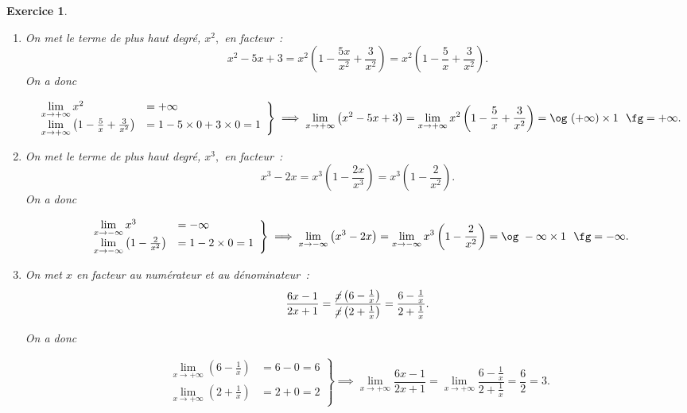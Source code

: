 \documentclass[10pt]{article}
\newtheorem{exo}{Exercice}
\begin{document}
\begin{exo}

\begin{enumerate}
\item On met le terme de plus haut degré, $x^2,$ en facteur~:
\[x^2-5x+3=x^2\left(1-\frac{5x}{x^2}+\frac{3}{x^2}\right)=x^2\left(1-\frac{5}{x}+\frac{3}{x^2}\right).\]
On a donc

\[
\left.
    \begin{array}{ll}
        \lim\limits_{x\to +\infty}x^2&=  +\infty\\
        \lim\limits_{x\to +\infty}\left(1-\frac{5}{x}+\frac{3}{x^2}\right) &= 1-5\times 0+3\times 0=1
    \end{array}
\right \}\implies \lim\limits_{x\to +\infty}\left(x^2-5x+3\right)=\lim\limits_{x\to +\infty}x^2\left(1-\frac{5}{x}+\frac{3}{x^2}\right)= \text{\og}~(+\infty)\times 1~\text{ \fg}=+\infty.
\]

\item On met le terme de plus haut degré, $x^3,$ en facteur~:
\[x^3-2x=x^3\left(1-\frac{2x}{x^3}\right)=x^3\left(1-\frac{2}{x^2}\right).\]
On a donc

\[
\left.
    \begin{array}{ll}
        \lim\limits_{x\to -\infty}x^3&=  -\infty\\
        \lim\limits_{x\to -\infty}\left(1-\frac{2}{x^2}\right) &= 1-2\times 0=1
    \end{array}
\right \}\implies \lim\limits_{x\to -\infty}\left(x^3-2x\right)=\lim\limits_{x\to -\infty}x^3\left(1-\frac{2}{x^2}\right)= \text{\og}~-\infty\times 1~\text{ \fg}=-\infty.
\]
\item On met $x$ en facteur au numérateur et au dénominateur~:
\[\frac{6x-1}{2x+1}=\frac{\cancel{x}\left(6-\frac{1}{x}\right)}{\cancel{x}\left(2+\frac{1}{x}\right)}=\frac{6-\frac{1}{x}}{2+\frac{1}{x}}.\]

On a donc

\[
\left.
    \begin{array}{ll}
        \lim\limits_{x\to +\infty}\left(6-\frac{1}{x}\right)&= 6-0=6\\
        \lim\limits_{x\to +\infty}\left(2+\frac{1}{x}\right) &= 2+0=2
    \end{array}
\right \}\implies \lim\limits_{x\to +\infty}\frac{6x-1}{2x+1}=\lim\limits_{x\to +\infty}\frac{6-\frac{1}{x}}{2+\frac{1}{x}}= \frac{6}{2}=3.
\]

\end{enumerate}


\end{exo}
\end{document}
